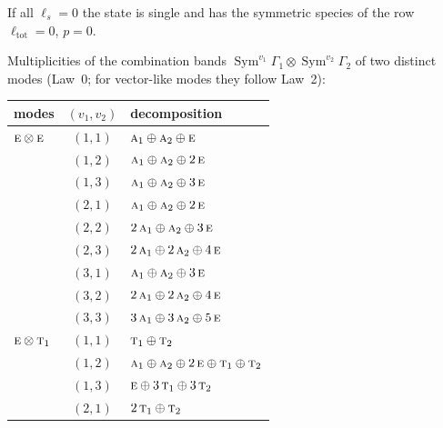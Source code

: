 \documentclass[11pt]{article}
\newcommand{\irr}[1]{\text{\normalfont\scshape #1}}
\begin{document}
If all $\ell_s=0$ the state is single and has the symmetric species of the row $\ell_{\mathrm{tot}}=0$, $p=0$.

Multiplicities of the combination bands $\operatorname{Sym}^{v_1}\Gamma_1\otimes\operatorname{Sym}^{v_2}\Gamma_2$ of two distinct modes (Law~0; for vector-like modes they follow Law~2):

\begin{longtable}{p{} c p{}}\hline modes & $(v_1,v_2)$ & decomposition\\ \hline\endhead

$\irr{e}\otimes \irr{e}$ & $(1,1)$ & $\irr{a}_{1}\oplus \irr{a}_{2}\oplus \irr{e}$\\

 & $(1,2)$ & $\irr{a}_{1}\oplus \irr{a}_{2}\oplus 2\,\irr{e}$\\

 & $(1,3)$ & $\irr{a}_{1}\oplus \irr{a}_{2}\oplus 3\,\irr{e}$\\

 & $(2,1)$ & $\irr{a}_{1}\oplus \irr{a}_{2}\oplus 2\,\irr{e}$\\

 & $(2,2)$ & $2\,\irr{a}_{1}\oplus \irr{a}_{2}\oplus 3\,\irr{e}$\\

 & $(2,3)$ & $2\,\irr{a}_{1}\oplus 2\,\irr{a}_{2}\oplus 4\,\irr{e}$\\

 & $(3,1)$ & $\irr{a}_{1}\oplus \irr{a}_{2}\oplus 3\,\irr{e}$\\

 & $(3,2)$ & $2\,\irr{a}_{1}\oplus 2\,\irr{a}_{2}\oplus 4\,\irr{e}$\\

 & $(3,3)$ & $3\,\irr{a}_{1}\oplus 3\,\irr{a}_{2}\oplus 5\,\irr{e}$\\

\hline

$\irr{e}\otimes \irr{t}_{1}$ & $(1,1)$ & $\irr{t}_{1}\oplus \irr{t}_{2}$\\

 & $(1,2)$ & $\irr{a}_{1}\oplus \irr{a}_{2}\oplus 2\,\irr{e}\oplus \irr{t}_{1}\oplus \irr{t}_{2}$\\

 & $(1,3)$ & $\irr{e}\oplus 3\,\irr{t}_{1}\oplus 3\,\irr{t}_{2}$\\

 & $(2,1)$ & $2\,\irr{t}_{1}\oplus \irr{t}_{2}$\\


\end{longtable}
\end{document}
